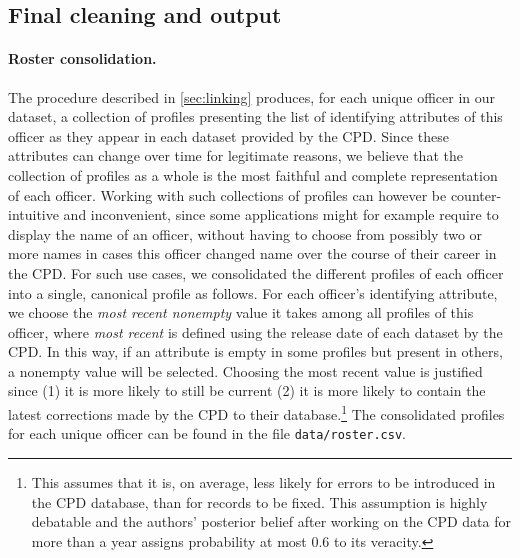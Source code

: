 

\subsection{Final cleaning and output}

\paragraph{Roster consolidation.}
The procedure described in \cref{sec:linking} produces, for each unique officer
in our dataset, a collection of profiles presenting the list of identifying
attributes of this officer as they appear in each dataset provided by the CPD.
Since these attributes can change over time for legitimate reasons, we believe
that the collection of profiles as a whole is the most faithful and complete
representation of each officer. Working with such collections of profiles can
however be counter-intuitive and inconvenient, since some applications might
for example require to display the name of an officer, without having to choose
from possibly two or more names in cases this officer changed name over the
course of their career in the CPD. For such use cases, we consolidated the
different profiles of each officer into a single, canonical profile as follows.
For each officer's identifying attribute, we choose the \emph{most recent
nonempty} value it takes among all profiles of this officer, where \emph{most
recent} is defined using the release date of each dataset by the CPD. In this way,
if an attribute is empty in some profiles but present in others, a nonempty value
will be selected. Choosing the most recent value is justified since (1) it is
more likely to still be current (2) it is more likely to contain the latest
corrections made by the CPD to their database.\footnote{This assumes that it
is, on average, less likely for errors to be introduced in the CPD database,
than for records to be fixed. This assumption is highly debatable and the
authors' posterior belief after working on the CPD data for more than a year
assigns probability at most $0.6$ to its veracity.} The consolidated profiles
for each unique officer can be found in the file \texttt{data/roster.csv}.


